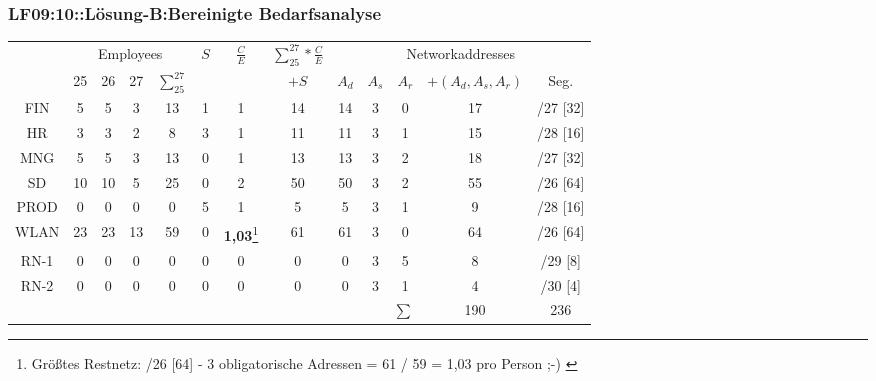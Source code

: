\begin{frame}[fragile]  
  \frametitle{LF09:10::Lösung-B:Bereinigte Bedarfsanalyse}
  
  \vspace{1cm}
  \begin{tiny}
  \renewcommand{\arraystretch}{1.5}
  \begin{tabular}{|c|c|c|c|c|c|c||c||c|c|c|c|c|}
      
    & \multicolumn{4}{c|}{Employees} %
    & \multirow{2}{*}{$S$} %
    & \multirow{2}{*}{$\frac{C}{E}$} %
    & $\sum_{25}^{27}{}*\frac{C}{E}$
    & \multicolumn{5}{c|}{Networkaddresses} \\  
    & 25 & 26 & 27
    & $\sum_{25}^{27}$ &  &
    & $+S$
    & $A_{d}$ 
    & $A_{s}$
    & $A_{r}$
    & $+(A_{d},A_{s},A_{r})$
    & Seg.
    \\  
    \hline
    \hline
    FIN    & 5 & 5 & 3 & 13 & 1 & 1 & 14 & 14 & 3 & 0 & 17 & /27 [32]\\
    \hline
    HR     & 3 & 3 & 2 & 8 & 3 & 1 & 11 & 11 & 3 & 1 & 15 & /28 [16]\\
    \hline
    MNG     & 5 & 5 & 3 & 13 & 0 & 1 & 13 & 13 & 3 & 2 & 18 & /27 [32]\\
    \hline
    SD     & 10 & 10 & 5 & 25 & 0 & 2 & 50 & 50 & 3 & 2 & 55 & /26 [64]\\
    \hline
    PROD     & 0 & 0 & 0 & 0 & 5 & 1 & 5 &  5 & 3 & 1 & 9 & /28 [16]\\
    \hline
    WLAN   & 23 & 23 & 13 & 59 & 0 & \textbf{1,03}\footnote{\tiny{Größtes Restnetz: /26 [64] - 3 obligatorische Adressen = 61 / 59 = 1,03 pro Person ;-) }} & 61 & 61 & 3 & 0 & 64 & /26 [64]\\
    \hline
    \hline
    RN-1   & 0 & 0 & 0 & 0 & 0 & 0 & 0 & 0 & 3 & 5 & 8 & /29 [8]\\
    \hline
    RN-2   & 0 & 0 & 0 & 0 & 0 & 0 & 0 & 0 & 3 & 1 & 4 & /30 [4]\\
    \hline
    \multicolumn{11}{r}{$\sum$}
    & 190
    & 236 \\
  
  \end{tabular}
  \end{tiny}
\end{frame}

